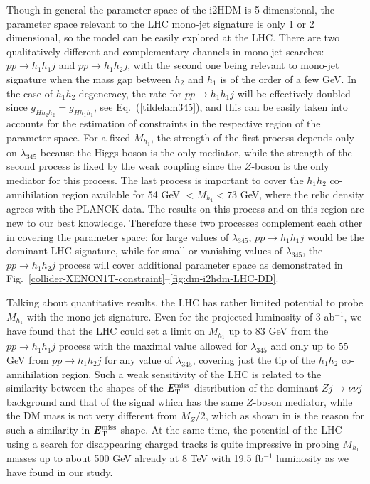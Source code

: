 \documentclass[12pt,a4paper]{article}
\newcommand{\MET}{\textbf{\textit{E}$_{\rm T}^{\rm miss}$}}
\begin{document}
Though in general the parameter space of the i2HDM is 5-dimensional,
the parameter space relevant to the LHC mono-jet signature is only 1 or 2 dimensional,
so the model can be easily explored at the LHC.
There are two qualitatively different and complementary channels in mono-jet searches:
$pp\to h_1 h_1j$ and $pp\to h_1 h_2 j$,
with the second one being relevant to mono-jet signature
when the mass gap between $h_2$ and $h_1$
is of the order of a few GeV.
In the case of $h_1 h_2$ degeneracy, the rate for $pp\to h_1 h_1j$
will be effectively doubled since $g_{Hh_2 h_2} = g_{Hh_1h_1}$, see Eq.~(\ref{tildelam345}),
and this can be easily taken into accounts for the estimation of constraints
in the respective region of the parameter space.
For a fixed $M_{h_1}$, the strength of the first  process 
depends only on $\lambda_{345}$ because the Higgs boson is the only mediator,
while the  strength of the second  process 
is fixed by the weak coupling since the $Z$-boson is the  only mediator
for this process.
The last process is important to cover the $h_1 h_2$ co-annihilation region
available for 54 GeV $< M_{h_1} <73$ GeV,
where the relic density agrees with the PLANCK data.
The results on this process and on this region are new to our best knowledge.
Therefore these two processes complement each other in covering the parameter space:
for large values of $\lambda_{345}$, $pp\to h_1 h_1j$ would be the dominant LHC
signature, while for small or vanishing values of $\lambda_{345}$, the
$pp\to h_1 h_2 j$ process will cover additional parameter space
as demonstrated in Fig.~\ref{collider-XENON1T-constraint}--\ref{fig:dm-i2hdm-LHC-DD}.

Talking about quantitative results,
the LHC has rather limited potential to probe $M_{h_1}$
with the mono-jet signature. Even for the projected luminosity of 3 ab$^{-1}$,
we have found that the LHC could set a limit on $M_{h_1}$  up to 83 GeV
from the $pp\to h_1 h_1j$ process with the maximal value allowed for  $\lambda_{345}$
and  only up to 55 GeV from  $pp\to h_1 h_2j$
for any value of  $\lambda_{345}$, covering just the tip of the $h_1 h_2$ co-annihilation
region. Such a weak sensitivity of the LHC is related to
the similarity between the shapes of the \MET{} distribution of the dominant $Zj\to \nu\nu j$ background
and that of the signal which has the same $Z$-boson mediator, while the DM mass is not very different from $M_Z/2$,
which as shown in \cite{Belyaev:2016pxe} is the reason for such a similarity in \MET{} shape.
At the same time, the potential of the LHC using a search for disappearing charged tracks
is quite impressive  in probing  $M_{h_1}$ masses up to about 500 GeV
already at 8 TeV with 19.5 fb$^{-1}$ luminosity
as we have found in our study.
\end{document}
